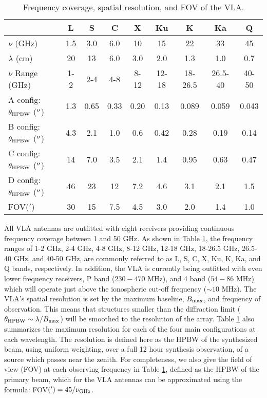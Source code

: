 \begin{table}
\begin{center}
\caption[Frequency Coverage, Spatial Resolution, and FOV of the VLA]
{Frequency coverage, spatial resolution, and FOV of the VLA.}
\begin{tabular}{lcccccccc}
\hline
\hline
\rule{0pt}{2.5ex} &  L& S&C&X&Ku&K&Ka&Q\\
\hline
\rule{0pt}{2.5ex}$\nu$ (GHz)& 1.5& 3.0&6.0&10&15&22&33&45\\
$\lambda$ (cm)& 20& 13&6.0&3.0&2.0&1.3&1.0&0.7\\
$\nu$ Range (GHz)& 1-2& 2-4&4-8&8-12&12-18&18-26.5&26.5-40&40-50\\
A config: $\theta_{\rm{HPBW}}$ ($^{\prime\prime}$)&  1.3& 0.65&0.33&0.20&0.13&0.089&0.059&0.043\\
B config: $\theta_{\rm{HPBW}}$ ($^{\prime\prime}$)&  4.3& 2.1&1.0&0.6&0.42&0.28&0.19&0.14\\
C config: $\theta_{\rm{HPBW}}$ ($^{\prime\prime}$)&  14& 7.0&3.5&2.1&1.4&0.95&0.63&0.47\\
D config: $\theta_{\rm{HPBW}}$ ($^{\prime\prime}$)&  46& 23&12&7.2&4.6&3.1&2.1&1.5\\
FOV($'$)& 30& 15&7.5 &4.5 &3.0&2.0&1.4&1.0\\
\hline
\end{tabular}
\label{tab:3.6}
\end{center}
\end{table}
All VLA antennas are outfitted with eight receivers providing continuous frequency coverage between 1 and 50 GHz. As shown in Table \ref{tab:3.6}, the frequency ranges of 1-2 GHz, 2-4 GHz, 4-8 GHz, 8-12 GHz, 12-18 GHz, 18-26.5 GHz, 26.5-40 GHz, and 40-50 GHz, are commonly referred to as L, S, C, X, Ku, K, Ka, and Q bands, respectively. In addition, the VLA is currently being outfitted with even lower frequency receivers, P band ($230-470$ MHz), and 4 band ($54-86$ MHz) which will operate just above the ionospheric cut-off frequency ($\sim 10$ MHz). The VLA's spatial resolution is set by the maximum baseline, $B_{\rm{max}}$, and frequency of observation. This means that structures smaller than the diffraction limit ($\theta_{\rm{HPBW}} \sim \lambda/B_{\rm{max}}$) will be smoothed to the resolution of the array. Table \ref{tab:3.6} also summarizes the maximum resolution for each of the four main configurations at each wavelength. The resolution is defined here as the HPBW of the synthesized beam, using uniform weighting, over a full 12 hour synthesis observation, of a source which passes near the zenith. For completeness, we also give the field of view (FOV) at each observing frequency in Table \ref{tab:3.6}, defined as the HPBW  of the primary beam, which for the VLA antennas can be approximated using the formula: FOV$(')= 45/\nu _{\rm{GHz}}$. 

